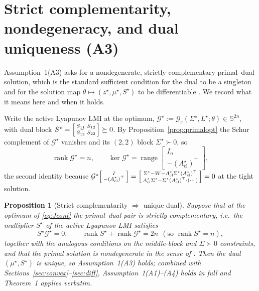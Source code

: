 \documentclass[11pt]{article}
\newtheorem{proposition}{Proposition}
\theoremstyle{definition}
\DeclareMathOperator{\rank}{rank}
\DeclareMathOperator{\range}{range}
\newcommand{\Sym}{\mathbb{S}}
\newcommand{\Acl}{A_{\mathrm{cl}}}
\newcommand{\Th}{\theta}
\newcommand{\Sig}{\Sigma}
\begin{document}
\section{Strict complementarity, nondegeneracy, and dual uniqueness (A3)}\label{sec:a3}

Assumption~1(A3) asks for a nondegenerate, strictly complementary primal--dual
solution, which is the standard sufficient condition for the dual to be a
singleton and for the solution map $\Th\mapsto(z^\star,\mu^\star,S^\star)$ to be
differentiable \cite{AHO,Shapiro97}. We record what it means here and when it
holds.

Write the active Lyapunov LMI at the optimum, $\mathcal
G^\star:=\mathcal G_{\mathrm c}(\Sig^\star,L^\star;\Th)\in\Sym^{2n}$, with
dual block $S^\star=\begin{bsmallmatrix}S_{11}&S_{12}\\S_{12}^\top&S_{22}
\end{bsmallmatrix}\succeq0$. By Proposition~\ref{prop:primalopt} the Schur
complement of $\mathcal G^\star$ vanishes and its $(2,2)$ block $\Sig^\star\succ0$,
so
\begin{equation}\label{eq:rankprimal}
\rank \mathcal G^\star=n,\qquad
\ker \mathcal G^\star
=\range\begin{bmatrix}I_n\\ -(\Acl^\star)^\top\end{bmatrix},
\end{equation}
the second identity because
$\mathcal G^\star\begin{bsmallmatrix}I\\-(\Acl^\star)^\top\end{bsmallmatrix}
=\begin{bsmallmatrix}\Sig^\star-W-\Acl^\star\Sig^\star(\Acl^\star)^\top\\
\Acl^\star\Sig^\star-\Sig^\star(\Acl^\star)^\top\cdot(\cdots)\end{bsmallmatrix}=0$
at the tight solution.

\begin{proposition}[Strict complementarity $\Rightarrow$ unique dual]\label{prop:sc}
Suppose that at the optimum of \eqref{eq:Jcont} the primal--dual pair is strictly
complementary, i.e.\ the multiplier $S^\star$ of the active Lyapunov LMI satisfies
\begin{equation}\label{eq:sc}
S^\star\mathcal G^\star=0,\qquad \rank S^\star+\rank\mathcal G^\star=2n
\ \ (\text{so }\rank S^\star=n),
\end{equation}
together with the analogous conditions on the middle-block and $\Sig\succ0$
constraints, and that the primal solution is nondegenerate in the sense of
\cite{AHO}. Then the dual $(\mu^\star,S^\star)$ is unique, so
Assumption~1(A3) holds; combined with Sections~\ref{sec:convex}--\ref{sec:diff},
Assumption~1(A1)--(A4) holds in full and Theorem~1 applies verbatim.
\end{proposition}
\end{document}
